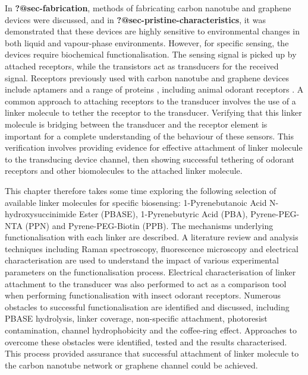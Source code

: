 \documentclass[
  a4paper,
]{scrbook}
\begin{document}
In \textbf{?@sec-fabrication}, methods of fabricating carbon nanotube
and graphene devices were discussed, and in
\textbf{?@sec-pristine-characteristics}, it was demonstrated that these
devices are highly sensitive to environmental changes in both liquid and
vapour-phase environments. However, for specific sensing, the devices
require biochemical functionalisation. The sensing signal is picked up
by attached receptors, while the transistors act as transducers for the
received signal. Receptors previously used with carbon nanotube and
graphene devices include aptamers
\autocite{Khan2021,Nguyen2021,Shkodra2021,Nekrasov2021,Mishyn2022,Cassie2023}
and a range of proteins \autocite{Lerner2014,Ahn2020,Tong2020,Wang2020},
including animal odorant receptors
\autocite{Goldsmith2011,Lee2018,Murugathas2019a,Murugathas2020,Moon2020,Yoo2022}.
A common approach to attaching receptors to the transducer involves the
use of a linker molecule to tether the receptor to the transducer.
Verifying that this linker molecule is bridging between the transducer
and the receptor element is important for a complete understanding of
the behaviour of these sensors. This verification involves providing
evidence for effective attachment of linker molecule to the transducing
device channel, then showing successful tethering of odorant receptors
and other biomolecules to the attached linker molecule.

This chapter therefore takes some time exploring the following selection
of available linker molecules for specific biosensing: 1-Pyrenebutanoic
Acid N-hydroxysuccinimide Ester (PBASE), 1-Pyrenebutyric Acid (PBA),
Pyrene-PEG-NTA (PPN) and Pyrene-PEG-Biotin (PPB). The mechanisms
underlying functionalisation with each linker are described. A
literature review and analysis techniques including Raman spectroscopy,
fluorescence microscopy and electrical characterisation are used to
understand the impact of various experimental parameters on the
functionalisation process. Electrical characterisation of linker
attachment to the transducer was also performed to act as a comparison
tool when performing functionalisation with insect odorant receptors.
Numerous obstacles to successful functionalisation are identified and
discussed, including PBASE hydrolysis, linker coverage, non-specific
attachment, photoresist contamination, channel hydrophobicity and the
coffee-ring effect. Approaches to overcome these obstacles were
identified, tested and the results characterised. This process provided
assurance that successful attachment of linker molecule to the carbon
nanotube network or graphene channel could be achieved.
\end{document}

